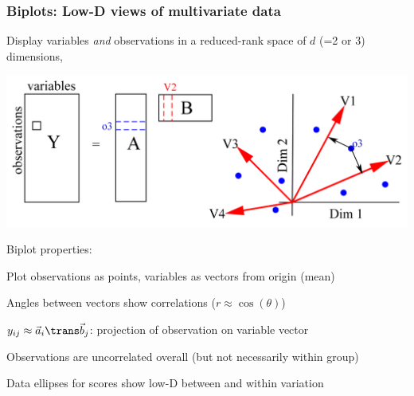 \renewcommand{\FileName}{biplot2}

\begin{frame}
  \frametitle{Biplots: Low-D views of multivariate data}
  \begin{itemize*}
    \item Display variables \emph{and} observations in a reduced-rank space of $d$ (=2 or 3) dimensions,
%	
%	
  \begin{center}
	\includegraphics[width=.7\textwidth,clip]{fig/biplotdemo}
  \end{center}

%
	\item Biplot properties:
  	\begin{itemize*}
	\item Plot observations as points, variables as vectors from origin (mean)
	\item Angles between vectors show \alert{correlations} ($r \approx \cos (\theta)$)
	\item $y_{ij} \approx \vec{a}_i \trans \vec{b}_j$: projection of observation on variable vector
	\item Observations are uncorrelated overall (but not necessarily within group)
	\item Data ellipses for scores show low-D between and within variation
  	\end{itemize*}

  \end{itemize*}
\end{frame}

